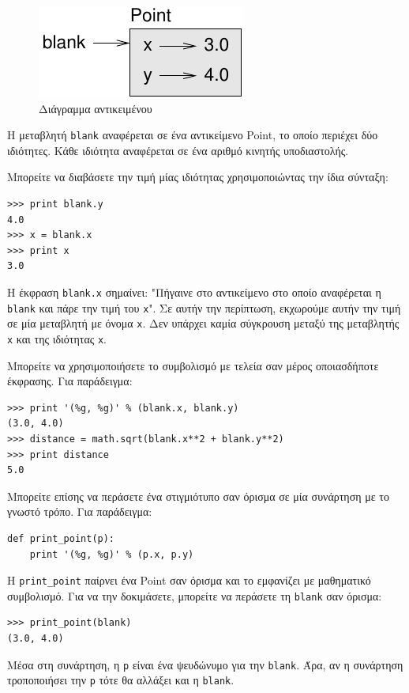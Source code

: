 \documentclass[10pt]{book}
\begin{document}
\begin{figure}
\centerline
{\includegraphics[scale=0.8]{figs/point.pdf}}
 \caption{Διάγραμμα αντικειμένου} 
\label{fig.point}
\end{figure}


Η μεταβλητή {\tt blank} αναφέρεται σε ένα αντικείμενο Point, το οποίο περιέχει δύο ιδιότητες.
Κάθε ιδιότητα αναφέρεται σε ένα αριθμό κινητής υποδιαστολής.

Μπορείτε να διαβάσετε την τιμή μίας ιδιότητας χρησιμοποιώντας την ίδια σύνταξη:

\begin{verbatim}
>>> print blank.y
4.0
>>> x = blank.x
>>> print x
3.0
\end{verbatim}
%
Η έκφραση {\tt blank.x} σημαίνει: "Πήγαινε στο αντικείμενο στο οποίο αναφέρεται η {\tt blank} και
πάρε την τιμή του {\tt x}". Σε αυτήν την περίπτωση, εκχωρούμε αυτήν την τιμή σε μία μεταβλητή με όνομα 
{\tt x}. Δεν υπάρχει καμία σύγκρουση μεταξύ της μεταβλητής  {\tt x}  και της ιδιότητας {\tt x}.

Μπορείτε να χρησιμοποιήσετε το συμβολισμό με τελεία σαν μέρος οποιασδήποτε έκφρασης. Για παράδειγμα:

\begin{verbatim}
>>> print '(%g, %g)' % (blank.x, blank.y)
(3.0, 4.0)
>>> distance = math.sqrt(blank.x**2 + blank.y**2)
>>> print distance
5.0
\end{verbatim}
%
Μπορείτε επίσης να περάσετε ένα στιγμιότυπο σαν όρισμα σε μία συνάρτηση με το γνωστό τρόπο. Για παράδειγμα:

\begin{verbatim}
def print_point(p):
    print '(%g, %g)' % (p.x, p.y)
\end{verbatim}
%
Η \verb"print_point" παίρνει ένα Point σαν όρισμα και το εμφανίζει με μαθηματικό συμβολισμό. 
Για να την δοκιμάσετε, μπορείτε να περάσετε τη {\tt blank} σαν όρισμα:

\begin{verbatim}
>>> print_point(blank)
(3.0, 4.0)
\end{verbatim}
%
Μέσα στη συνάρτηση, η {\tt p} είναι ένα ψευδώνυμο για την {\tt blank}. Άρα, αν η συνάρτηση τροποποιήσει
την {\tt p} τότε θα αλλάξει και η {\tt blank}.
\\
\end{document}
